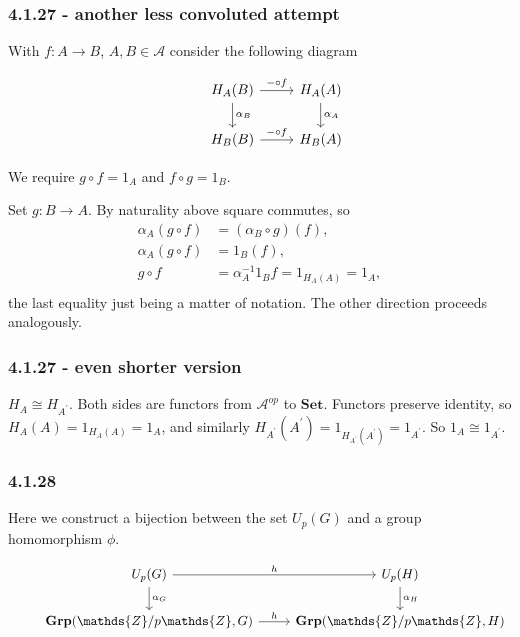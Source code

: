\documentclass{article}
\begin{document}
\subsubsection*{4.1.27 - another less convoluted attempt}

With $f\colon A \rightarrow B$, $A, B \in \mathcal{A}$ consider the following diagram

\begin{equation*}
\begin{tikzcd}
  & H_A(B) \arrow[d,"\alpha_B"] \arrow[r, "\mathit{-} \circ f"] & H_A(A) \arrow[d,"\alpha_{A}"] \\
  & H_{B}(B) \arrow[r,"\mathit{-} \circ f"] & H_{B}(A)
\end{tikzcd}
\end{equation*}

We require $g \circ f = 1_A$ and $f \circ g = 1_B$.

Set $g\colon B \rightarrow A$. By naturality above square commutes, so
\begin{align*}
  \alpha_A(g \circ f) &= (\alpha_B \circ g)(f),   \\
  \alpha_A(g \circ f) &= 1_B(f), \\
  g \circ f &= \alpha_A^{-1}1_Bf = 1_{H_A(A)} = 1_A, \\
\end{align*}
the last equality just being a matter of notation. The other direction proceeds analogously.

\subsubsection*{4.1.27 - even shorter version}

$H_A \cong H_{A^\prime}$. Both sides are functors from $\mathcal{A}^{op}$ to $\mathbf{Set}$. Functors preserve identity, so $H_A(A) = 1_{H_A(A)} = 1_A$, and similarly $H_{A^\prime}(A^\prime) = 1_{H_{A^\prime}(A^\prime)} = 1_{A^\prime}$. So $1_A \cong 1_{A^\prime}$.

\subsubsection*{4.1.28}

Here we construct a bijection between the set $U_p(G)$ and a group homomorphism $\phi$.

\begin{equation*}
\begin{tikzcd}
  & U_p(G) \arrow[d,"\alpha_G"] \arrow[r, "h"] & U_p(H) \arrow[d,"\alpha_{H}"] \\
  & \mathbf{Grp}(\mathds{Z}/p\mathds{Z}, G) \arrow[r,"h"] & \mathbf{Grp}(\mathds{Z}/p\mathds{Z}, H)
\end{tikzcd}
\end{equation*}
\end{document}
